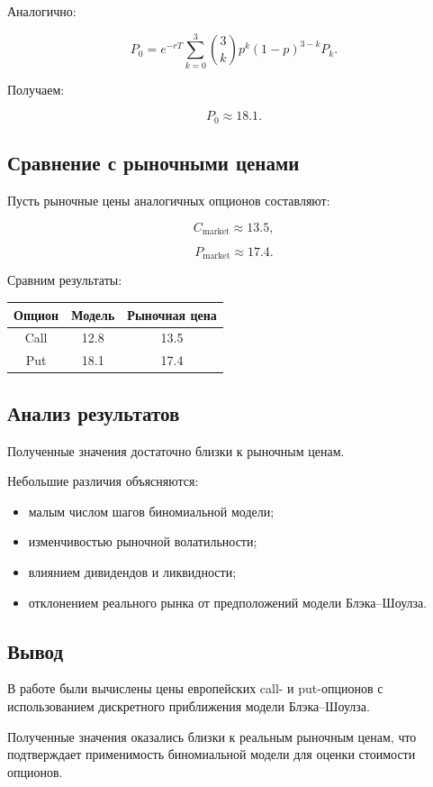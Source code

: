 Аналогично:

\[
P_0=
e^{-rT}
\sum_{k=0}^{3}
\binom{3}{k}
p^k(1-p)^{3-k}P_k.
\]

Получаем:

\[
P_0\approx18.1.
\]

\subsection*{Сравнение с рыночными ценами}

Пусть рыночные цены аналогичных опционов составляют:

\[
C_{\text{market}}\approx13.5,
\]

\[
P_{\text{market}}\approx17.4.
\]

Сравним результаты:

\begin{center}
\begin{tabular}{|c|c|c|}
\hline
Опцион & Модель & Рыночная цена \\
\hline
Call & 12.8 & 13.5 \\
Put & 18.1 & 17.4 \\
\hline
\end{tabular}
\end{center}

\subsection*{Анализ результатов}

Полученные значения достаточно близки к рыночным ценам.

Небольшие различия объясняются:
\begin{itemize}
    \item малым числом шагов биномиальной модели;
    \item изменчивостью рыночной волатильности;
    \item влиянием дивидендов и ликвидности;
    \item отклонением реального рынка от предположений модели Блэка--Шоулза.
\end{itemize}

\subsection*{Вывод}

В работе были вычислены цены европейских call- и put-опционов с использованием дискретного приближения модели Блэка--Шоулза.

Полученные значения оказались близки к реальным рыночным ценам, что подтверждает применимость биномиальной модели для оценки стоимости опционов.

